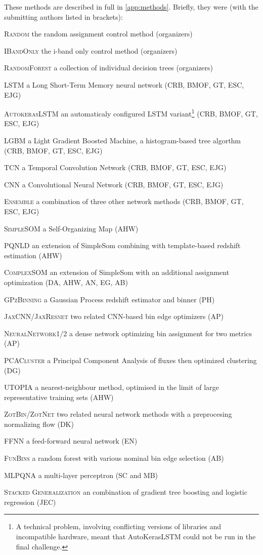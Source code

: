 \documentclass[twocolumn,twocolappendix]{aastex63}
\begin{document}
These methods are described in full in \autoref{app:methods}.  Briefly, they were (with the submitting authors listed in brackets):
\begin{description*}
	\item[\textsc{Random}] the random assignment control method (organizers)
	\item[\textsc{IBandOnly}] the i-band only control method (organizers)
	\item[\textsc{RandomForest}] a collection of individual decision trees (organizers)
	\item[\textsc{LSTM}] a Long Short-Term Memory neural network (CRB, BMOF, GT, ESC, EJG)
	\item[\textsc{AutokerasLSTM}] an automaticaly configured LSTM variant\footnote{A technical problem, involving conflicting versions of libraries and incompatible hardware, meant that AutoKerasLSTM could not be run in the final challenge.} (CRB, BMOF, GT, ESC, EJG)
	\item[\textsc{LGBM}] a Light Gradient Boosted Machine, a histogram-based tree algorthm (CRB, BMOF, GT, ESC, EJG)
	\item[\textsc{TCN}] a Temporal Convolution Network (CRB, BMOF, GT, ESC, EJG)
	\item[\textsc{CNN}] a Convolutional Neural Network (CRB, BMOF, GT, ESC, EJG)
	\item[\textsc{Ensemble}] a combination of three other network methods (CRB, BMOF, GT, ESC, EJG)
	\item[\textsc{SimpleSOM}] a Self-Organizing Map (AHW)
	\item[\textsc{PQNLD}] an extension of {\sc SimpleSom} combining with template-based redshift estimation (AHW)
	\item[\textsc{ComplexSOM}] an extension of {\sc SimpleSom} with an additional assignment optimization (DA, AHW, AN, EG, AB)
	\item[\textsc{GPzBinning}] a Gaussian Process redshift estimator and binner (PH)
	\item[\textsc{JaxCNN/JaxResnet}] two related CNN-based bin edge optimizers (AP)
	\item[\textsc{NeuralNetwork1/2}] a dense network optimizing bin assignment for two metrics (AP)
	\item[\textsc{PCACluster}] a Principal Component Analysis of fluxes then optimized clustering (DG)
	\item[\textsc{UTOPIA}] a nearest-neighbour method, optimised in the limit of large representative training sets (AHW)
	\item[\textsc{ZotBin/ZotNet}] two related neural network methods with a preprocesing normalizing flow (DK)
	\item[\textsc{FFNN}] a feed-forward neural network (EN)
	\item[\textsc{FunBins}] a random forest with various nominal bin edge selection (AB)
	\item[\textsc{MLPQNA}] a multi-layer perceptron (SC and MB)
	\item[\textsc{Stacked Generalization}] an combination of gradient tree boosting and logistic regression (JEC)
\end{description*}
\end{document}
